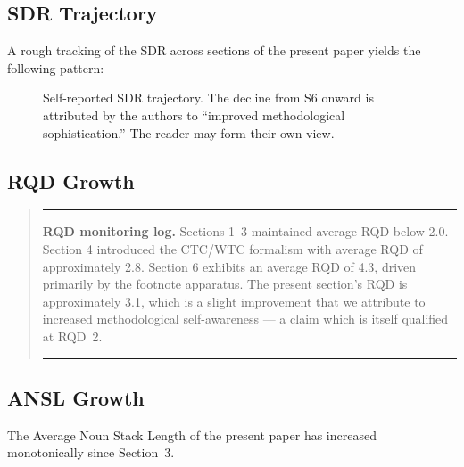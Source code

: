 \documentclass[12pt, a4paper]{article}
\newenvironment{metricbox}
  {\begin{quote}\small\color{obscuregray}\rule{\linewidth}{0.4pt}\par\smallskip}
  {\par\smallskip\rule{\linewidth}{0.4pt}\end{quote}}
\begin{document}
\subsection{SDR Trajectory}

A rough tracking of the SDR across sections of the present paper yields the following pattern:

\begin{figure}[H]
\centering
{}
\caption{Self-reported SDR trajectory. The decline from S6 onward is attributed by the authors to ``improved methodological sophistication.'' The reader may form their own view.}
\end{figure}

\subsection{RQD Growth}

\begin{metricbox}
\textbf{RQD monitoring log.} Sections 1--3 maintained average RQD below 2.0. Section 4 introduced the CTC/WTC formalism with average RQD of approximately 2.8. Section 6 exhibits an average RQD of 4.3, driven primarily by the footnote apparatus. The present section's RQD is approximately 3.1, which is a slight improvement that we attribute to increased methodological self-awareness --- a claim which is itself qualified at RQD~2.
\end{metricbox}

\subsection{ANSL Growth}

The Average Noun Stack Length of the present paper has increased monotonically since Section~3.
\end{document}
